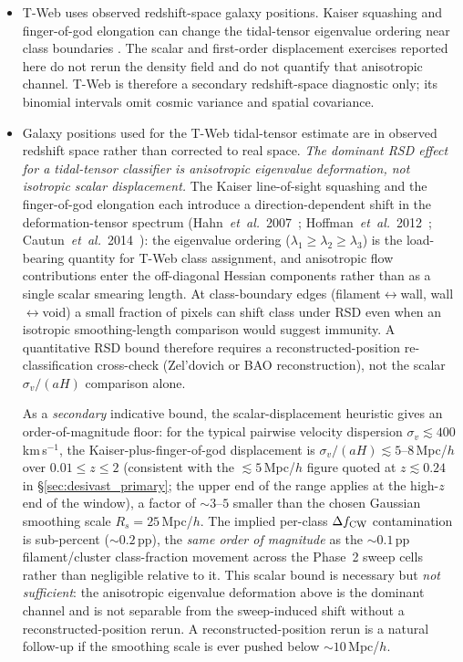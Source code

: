\documentclass[twocolumn,linenumbers]{aastex702}
\begin{document}
\begin{itemize}
cross-matched per-galaxy against our T-Web run in
\S\ref{sec:astra_per_object}; a full-DR1-footprint published VAC
remains a desirable future input that would let us replace T-Web as
the canonical classifier rather than only cross-validate it in
the EDR-overlap subset.
\item T-Web uses observed redshift-space galaxy positions. Kaiser
squashing and finger-of-god elongation can change the tidal-tensor
eigenvalue ordering near class boundaries
\cite{Hahn2007,Hoffman2012,Cautun2014}. The scalar and first-order
displacement exercises reported here do not rerun the density field and
do not quantify that anisotropic channel. T-Web is therefore a secondary
redshift-space diagnostic only; its binomial intervals omit cosmic
variance and spatial covariance.
\iffalse
\item Galaxy positions used for the T-Web tidal-tensor estimate are
in observed redshift space rather than corrected to real space.
\emph{The dominant RSD effect for a tidal-tensor classifier is
anisotropic eigenvalue deformation, not isotropic scalar displacement.}
The Kaiser
line-of-sight squashing and the finger-of-god elongation each
introduce a direction-dependent shift in the deformation-tensor
spectrum
(Hahn~\textit{et~al.}~2007~\cite{Hahn2007};
Hoffman~\textit{et~al.}~2012~\cite{Hoffman2012};
Cautun~\textit{et~al.}~2014~\cite{Cautun2014}): the eigenvalue
ordering ($\lambda_1 \ge \lambda_2 \ge \lambda_3$) is the
load-bearing quantity for T-Web class assignment, and anisotropic
flow contributions enter the off-diagonal Hessian components rather
than as a single scalar smearing length. At class-boundary edges
(filament$\leftrightarrow$wall, wall$\leftrightarrow$void) a small
fraction of pixels can shift class under RSD even when an isotropic
smoothing-length comparison would suggest immunity. A quantitative
RSD bound therefore requires a reconstructed-position re-classification
cross-check (Zel'dovich or BAO reconstruction), not the scalar
$\sigma_v/(aH)$ comparison alone.

As a \emph{secondary} indicative bound, the scalar-displacement
heuristic gives an order-of-magnitude floor: for the typical
pairwise velocity dispersion $\sigma_v \lesssim 400$\,km\,s$^{-1}$,
the Kaiser-plus-finger-of-god displacement is
$\sigma_v/(aH) \lesssim 5$--$8$\,Mpc/$h$ over $0.01 \le z \le 2$
(consistent with the $\lesssim 5$\,Mpc/$h$ figure quoted at
$z \lesssim 0.24$ in \S\ref{sec:desivast_primary}; the upper end of
the range applies at the high-$z$ end of the window),
a factor of $\sim 3$--$5$ smaller than the chosen Gaussian smoothing
scale $R_s = 25$\,Mpc/$h$. The implied per-class $\Delta f_{\rm CW}$
contamination is sub-percent ($\sim 0.2$\,pp), the
\emph{same order of magnitude} as the ${\sim}0.1$\,pp
filament/cluster class-fraction movement across the Phase~2 sweep
cells rather than negligible relative to it. This scalar bound is
necessary but \emph{not sufficient}: the anisotropic eigenvalue
deformation above is the dominant channel and is not separable from
the sweep-induced shift without a reconstructed-position rerun.
A reconstructed-position rerun is a natural follow-up if the smoothing
scale is ever pushed below $\sim 10$\,Mpc/$h$.


\end{itemize}
\end{document}
